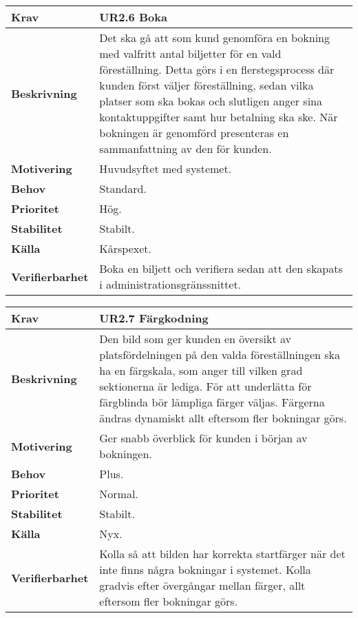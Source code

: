 \documentclass[a4paper, twoside, 11pt, titlepage]{article}
\begin{document}
		\begin{tabular} { p{2.6cm} p{12.5cm} }
			\hline
			\sffamily\textbf{Krav} & \sffamily\textbf{UR2.6 Boka  } \\
			\hline
			\sffamily\textbf{Beskrivning} & Det ska gå att som kund genomföra en bokning med valfritt antal biljetter för en vald föreställning. Detta görs i en flerstegsprocess där kunden först väljer föreställning, sedan vilka platser som ska bokas och slutligen anger sina kontaktuppgifter samt hur betalning ska ske. När bokningen är genomförd presenteras en sammanfattning av den för kunden.  \\
			\hline
			\sffamily\textbf{Motivering} & Huvudsyftet med systemet.  \\
			\hline
			\sffamily\textbf{Behov} & Standard.  \\
			\hline
			\sffamily\textbf{Prioritet} & Hög.  \\
			\hline
			\sffamily\textbf{Stabilitet} & Stabilt.  \\
			\hline
			\sffamily\textbf{Källa} & Kårspexet.  \\
			\hline
			\sffamily\textbf{Verifierbarhet} & Boka en biljett och verifiera sedan att den skapats i administrationsgränssnittet.  \\
			\hline
		\end{tabular}
		\vspace{6mm}

		\begin{tabular} { p{2.6cm} p{12.5cm} }
			\hline
			\sffamily\textbf{Krav} & \sffamily\textbf{UR2.7 Färgkodning  } \\
			\hline
			\sffamily\textbf{Beskrivning} & Den bild som ger kunden en översikt av platsfördelningen på den valda föreställningen ska ha en färgskala, som anger till vilken grad sektionerna är lediga. För att underlätta för färgblinda bör lämpliga färger väljas. Färgerna ändras dynamiskt allt eftersom fler bokningar görs.  \\
			\hline
			\sffamily\textbf{Motivering} & Ger snabb överblick för kunden i början av bokningen.  \\
			\hline
			\sffamily\textbf{Behov} & Plus.  \\
			\hline
			\sffamily\textbf{Prioritet} & Normal.  \\
			\hline
			\sffamily\textbf{Stabilitet} & Stabilt.  \\
			\hline
			\sffamily\textbf{Källa} & Nyx.  \\
			\hline
			\sffamily\textbf{Verifierbarhet} & Kolla så att bilden har korrekta startfärger när det inte finns några bokningar i systemet. Kolla gradvis efter övergångar mellan färger, allt eftersom fler bokningar görs.  \\
			\hline
		\end{tabular}
		\vspace{6mm}
\end{document}
